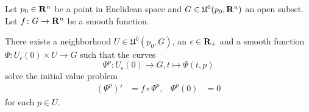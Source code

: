 Let $p_0 \in \mathbf{R}^n$ be a point in Euclidean space and
$G \in \mathfrak U^0(p_0, \mathbf{R}^n)$ an open subset. Let $f\colon G \to \mathbf{R}^n$
be a smooth function.

\begin{thm}
  \label{thm:diff_flow}
  There exists a neighborhood $U \in \mathfrak U^0(p_0, G)$, an
  $\epsilon \in \mathbf{R}_+$ and a smooth function $\Psi\colon
  U_\epsilon(0) \times U \to G$ such that the curves
  \[
    \Psi^p\colon U_\epsilon(0) \to G, t \mapsto \Psi(t, p)
  \]
  solve the initial value problem
  \begin{align*}
    (\Psi^p)' & = f \circ \Psi^p, &
    \Psi^p(0) & = 0
  \end{align*}
  for each $p \in U$.
\end{thm}

